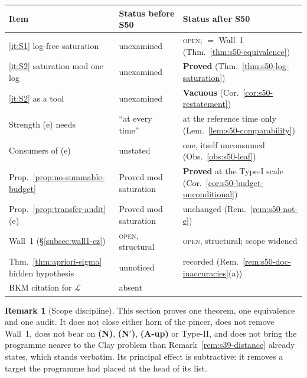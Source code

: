 \documentclass[11pt]{article}
\theoremstyle{definition}
\newtheorem{remark}[theorem]{Remark}
\theoremstyle{remark}
\begin{document}
\begin{center}
\begin{tabular}{@{}l l l@{}}
\hline
Item & Status before S50 & Status after S50 \\
\hline
\ref{it:S1} log-free saturation
  & unexamined & \textsc{open}; $=$ Wall~1 (Thm.~\ref{thm:s50-equivalence}) \\
\ref{it:S2} saturation mod one log
  & unexamined & \textbf{Proved} (Thm.~\ref{thm:s50-log-saturation}) \\
\ref{it:S2} as a tool
  & unexamined & \textbf{Vacuous} (Cor.~\ref{cor:s50-restatement}) \\
Strength (e) needs
  & ``at every time'' & at the reference time only (Lem.~\ref{lem:s50-comparability}) \\
Consumers of (e)
  & unstated & one, itself unconsumed (Obs.~\ref{obs:s50-leaf}) \\
Prop.~\ref{prop:no-summable-budget}
  & Proved mod saturation & \textbf{Proved} at the Type-I scale
    (Cor.~\ref{cor:s50-budget-unconditional}) \\
Prop.~\ref{prop:transfer-audit}(e)
  & Proved mod saturation & unchanged (Rem.~\ref{rem:s50-not-e}) \\
Wall~1 (§\ref{subsec:wall1-cz})
  & \textsc{open}, structural & \textsc{open}, structural; scope widened \\
Thm.~\ref{thm:apriori-sigma} hidden hypothesis
  & unnoticed & recorded (Rem.~\ref{rem:s50-doc-inaccuracies}(a)) \\
BKM citation for $\mathcal{L}$
  & absent & \cite{BKM1984,KozonoTaniuchi2000} \\
\hline
\end{tabular}
\end{center}

\begin{remark}[Scope discipline]\label{rem:s50-scope}
  This section proves one theorem, one equivalence and one audit. It does not
  close either horn of the pincer, does not remove Wall~1, does not bear on
  \textbf{(N)}, \textbf{(N$'$)}, \textbf{(A-up)} or Type-II, and does not
  bring the programme nearer to the Clay problem than
  Remark~\ref{rem:s39-distance} already states, which stands verbatim. Its
  principal effect is subtractive: it removes a target the programme had
  placed at the head of its list.
\end{remark}

\end{document}
